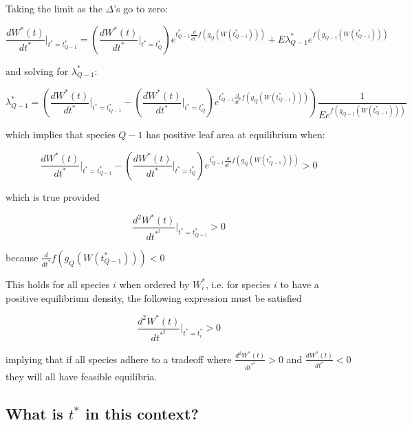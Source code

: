 \documentclass[11pt]{article}
\begin{document}
Taking the limit as the \(\Delta\)'s go to zero:

\begin{equation*}
  \frac{dW^{*}(t)}{dt^{*}}|_{t^{*} = t_{Q-1}^{*}} = \left(\frac{dW^{*}(t)}{dt^{*}}|_{t^{*} = t_{Q}^{*}}\right) e^{t_{Q-1}^{*} \frac{d}{dt^{*}} f(g_{Q}(W(t_{Q-1}^{*})))} + E \lambda_{Q-1}^{*}e^{f(g_{Q-1}(W(t_{Q-1}^{*})))}
\end{equation*}

and solving for \(\lambda_{Q-1}^{*}\):

\begin{equation*}
 \lambda_{Q-1}^{*} = \left( \frac{dW^{*}(t)}{dt^{*}}|_{t^{*} = t_{Q-1}^{*}} - \left(\frac{dW^{*}(t)}{dt^{*}}|_{t^{*} = t_{Q}^{*}}\right) e^{t_{Q-1}^{*} \frac{d}{dt^{*}} f(g_{Q}(W(t_{Q-1}^{*})))} \right) \frac{1}{E e^{f(g_{Q-1}(W(t_{Q-1}^{*})))}}
\end{equation*}

which implies that species \(Q-1\) has positive leaf area at equilibrium when:

\begin{equation*}
  \frac{dW^{*}(t)}{dt^{*}}|_{t^{*} = t_{Q-1}^{*}} - \left(\frac{dW^{*}(t)}{dt^{*}}|_{t^{*} = t_{Q}^{*}}\right) e^{t_{Q-1}^{*} \frac{d}{dt^{*}} f(g_{Q}(W(t_{Q-1}^{*})))} > 0
\end{equation*}

which is true provided

\begin{equation*}
  \frac{d^{2}W^{*}(t)}{dt^{*}^{2}}|_{t^{*} = t_{Q-1}^{*}} > 0
\end{equation*}

because \(\frac{d}{dt^{*}} f(g_{Q}(W(t_{Q-1}^{*}))) < 0\)

This holds for all species \(i\) when ordered by \(W_{i}^{*}\), i.e. for species \(i\) to have a positive equilibrium density, the following expression must be satisfied

\begin{equation*}
  \frac{d^{2}W^{*}(t)}{dt^{*}^{2}}|_{t^{*} = t_{i}^{*}} > 0
\end{equation*}

implying that if all species adhere to a tradeoff where \(\frac{d^{2}W^{*}(t)}{dt^{*}^{2}} > 0\) and \(\frac{dW^{*}(t)}{dt^{*}} < 0\) they will all have feasible equilibria.


\subsection{What is \(t^*\) in this context?}
\label{sec:org1a0a6fc}
\end{document}
